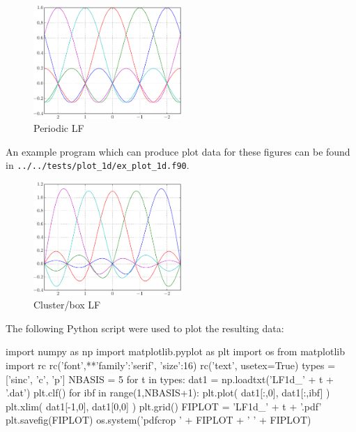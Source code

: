 \begin{figure}[h]
{\centering
\includegraphics[width=0.5\textwidth]{../../tests/plot_1d/LF1d_p.pdf}
\par}
\caption{Periodic LF}\label{fig:LF1d_p_5}
\end{figure}

An example program which can produce plot data for these figures can be
found in \texttt{../../tests/plot\_1d/ex\_plot\_1d.f90}.

\begin{figure}[h]
{\centering
\includegraphics[width=0.5\textwidth]{../../tests/plot_1d/LF1d_c.pdf}
\par}
\caption{Cluster/box LF}\label{fig:LF1d_c_5}
\end{figure}

The following Python script were used to plot the resulting data:
\begin{pythoncode}
import numpy as np
import matplotlib.pyplot as plt
import os
from matplotlib import rc
rc('font',**{'family':'serif', 'size':16})
rc('text', usetex=True)
types = ['sinc', 'c', 'p']
NBASIS = 5
for t in types:
    dat1 = np.loadtxt('LF1d_' + t + '.dat')
    plt.clf()
    for ibf in range(1,NBASIS+1):
        plt.plot( dat1[:,0], dat1[:,ibf] )
    plt.xlim( dat1[-1,0], dat1[0,0] )
    plt.grid()
    FIPLOT = 'LF1d_' + t + '.pdf'
    plt.savefig(FIPLOT)
    os.system('pdfcrop ' + FIPLOT + ' ' + FIPLOT)
\end{pythoncode}

